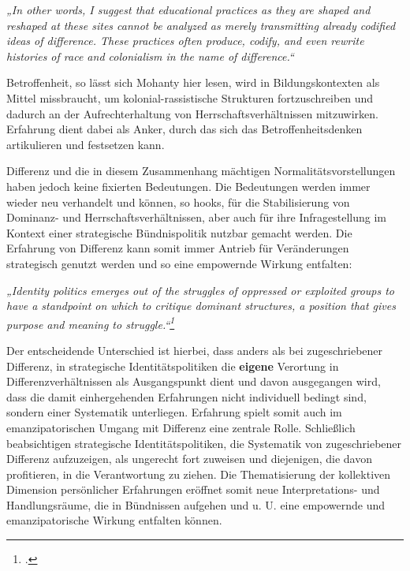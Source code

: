 \begin{myenv}
  \textit{
    „In other words, I suggest that educational practices as they are shaped
  and reshaped at these sites cannot be analyzed as merely transmitting already
codified ideas of difference. These practices often produce, codify, and even
rewrite histories of race and colonialism in the name of
difference.“\footnotemark {}
    }
\end{myenv}

Betroffenheit, so lässt sich Mohanty hier lesen, wird in Bildungskontexten als
Mittel missbraucht, um kolonial-rassistische Strukturen fortzuschreiben und
dadurch an der Aufrechterhaltung von Herrschaftsverhältnissen mitzuwirken.
Erfahrung dient dabei als Anker, durch das sich das Betroffenheitsdenken
artikulieren und festsetzen kann.

Differenz und die in diesem Zusammenhang mächtigen Normalitätsvorstellungen
haben jedoch keine fixierten Bedeutungen. Die Bedeutungen werden immer wieder
neu verhandelt und können, so hooks, für die Stabilisierung von Dominanz- und
Herrschaftsverhältnissen, aber auch für ihre Infragestellung im Kontext einer
strategische Bündnispolitik nutzbar gemacht werden. Die Erfahrung von Differenz
kann somit immer Antrieb für Veränderungen strategisch genutzt werden und so
eine empowernde Wirkung entfalten:

\begin{myenv}
  \textit{„Identity politics emerges out of the struggles of oppressed or
    exploited groups to have a standpoint on which to critique dominant
    structures, a position that gives purpose and meaning to
    struggle.“\footnotemark \footcitetext[88]{bellhooks}
    }
\end{myenv}

Der entscheidende Unterschied ist hierbei, dass anders als bei zugeschriebener
Differenz, in strategische Identitätspolitiken die \textbf{eigene} Verortung in
Differenzverhältnissen als Ausgangspunkt dient und davon ausgegangen wird, dass
die damit einhergehenden Erfahrungen nicht individuell bedingt sind, sondern
einer Systematik unterliegen. Erfahrung spielt somit auch im emanzipatorischen
Umgang mit Differenz eine zentrale Rolle. Schließlich beabsichtigen
strategische Identitätspolitiken, die Systematik von zugeschriebener Differenz
aufzuzeigen, als ungerecht fort zuweisen und diejenigen, die davon profitieren,
in die Verantwortung zu ziehen. Die Thematisierung der kollektiven Dimension
persönlicher Erfahrungen eröffnet somit neue Interpretations- und
Handlungsräume, die in Bündnissen aufgehen und u. U. eine empowernde und
emanzipatorische Wirkung entfalten können. 


